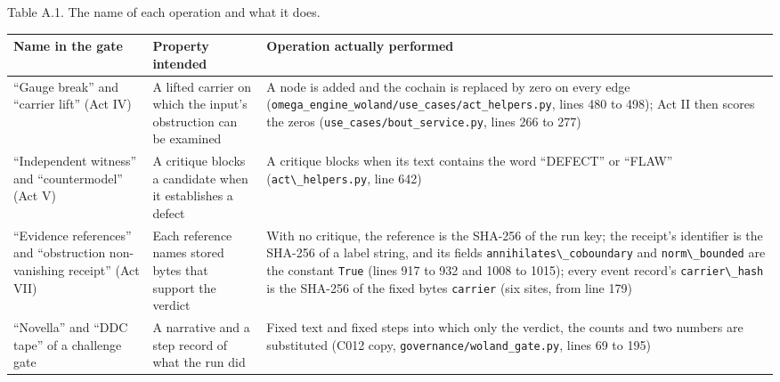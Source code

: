 \documentclass[
  11pt,
]{article}
\newcommand{\passthrough}[1]{#1}
\begin{document}
Table A.1. The name of each operation and what it does.

\begin{longtable}[]{@{}
  >{\raggedright\arraybackslash}p{}
  >{\raggedright\arraybackslash}p{}
  >{\raggedright\arraybackslash}p{}@{}}
\toprule\noalign{}
\begin{minipage}[b]{\linewidth}\raggedright
Name in the gate
\end{minipage} & \begin{minipage}[b]{\linewidth}\raggedright
Property intended
\end{minipage} & \begin{minipage}[b]{\linewidth}\raggedright
Operation actually performed
\end{minipage} \\
\midrule\noalign{}
\endhead
\bottomrule\noalign{}
\endlastfoot
``Gauge break'' and ``carrier lift'' (Act IV) & A lifted carrier on
which the input's obstruction can be examined & A node is added and the
cochain is replaced by zero on every edge
(\nolinkurl{omega_engine_woland/use_cases/act_helpers.py}, lines 480 to
498); Act II then scores the zeros
(\nolinkurl{use_cases/bout_service.py}, lines 266 to 277) \\
``Independent witness'' and ``countermodel'' (Act V) & A critique blocks
a candidate when it establishes a defect & A critique blocks when its
text contains the word ``DEFECT'' or ``FLAW''
(\passthrough{\lstinline!act\_helpers.py!}, line 642) \\
``Evidence references'' and ``obstruction non-vanishing receipt'' (Act
VII) & Each reference names stored bytes that support the verdict & With
no critique, the reference is the SHA-256 of the run key; the receipt's
identifier is the SHA-256 of a label string, and its fields
\passthrough{\lstinline!annihilates\_coboundary!} and
\passthrough{\lstinline!norm\_bounded!} are the constant
\passthrough{\lstinline!True!} (lines 917 to 932 and 1008 to 1015);
every event record's \passthrough{\lstinline!carrier\_hash!} is the
SHA-256 of the fixed bytes \passthrough{\lstinline!carrier!} (six sites,
from line 179) \\
``Novella'' and ``DDC tape'' of a challenge gate & A narrative and a
step record of what the run did & Fixed text and fixed steps into which
only the verdict, the counts and two numbers are substituted (C012 copy,
\nolinkurl{governance/woland_gate.py}, lines 69 to 195) \\
\end{longtable}
\end{document}
